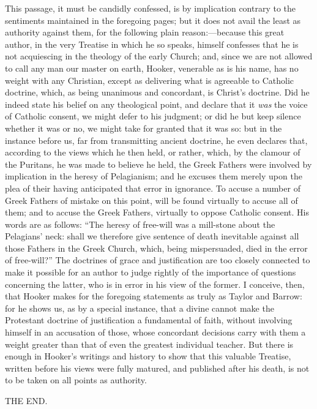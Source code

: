 This passage, it must be candidly confessed, is by implication
contrary to the sentiments maintained in the foregoing pages; but it
does not avail the least as authority against them, for the following
plain reason:—because this great author, in the very Treatise in
which he so speaks, himself confesses that he is not acquiescing in
the theology of the early Church; and, since we are not allowed to
call any man our master on earth, Hooker, venerable as is his name,
has no weight with any Christian, except as delivering what is
agreeable to Catholic doctrine, which, as being unanimous and
concordant, is Christ's doctrine. Did he indeed state his belief on
any theological point, and declare that it \emph{was} the voice of
Catholic consent, we might defer to his judgment; or did he but keep
silence whether it was or no, we might take for granted that it was
so: but in the instance before us, far from transmitting ancient
doctrine, he even declares that, according to the views which he then
held, or rather, which, by the clamour of the Puritans, he was made to
believe he held, the Greek Fathers were involved by implication in the
heresy of Pelagianism; and he excuses them merely upon the plea of
their having anticipated that error in ignorance. To accuse a number
of Greek Fathers of mistake on this point, will be found virtually to
accuse all of them; and to accuse the Greek Fathers, virtually to
oppose Catholic consent. His words are as follows: ``The heresy of
free-will was a mill-stone about the Pelagians' neck: shall we
therefore give sentence of death inevitable against all those Fathers
in the Greek Church, which, being mispersuaded, died in the error of
free-will?'' The doctrines of grace and justification are too
closely connected to make it possible for an author to judge rightly
of the importance of questions concerning the latter, who is in error
in his view of the former. I conceive, then, that Hooker makes for the
foregoing statements as truly as Taylor and Barrow: for he shows us,
as by a special instance, that a divine cannot make the
Protestant doctrine of justification a fundamental of faith, without
involving himself in an accusation of those, whose concordant
decisions carry with them a weight greater than that of even the
greatest individual teacher. But there is enough in Hooker's writings
and history to show that this valuable Treatise, written before his
views were fully matured, and published after his death, is not to be
taken on all points as authority.

THE END.
